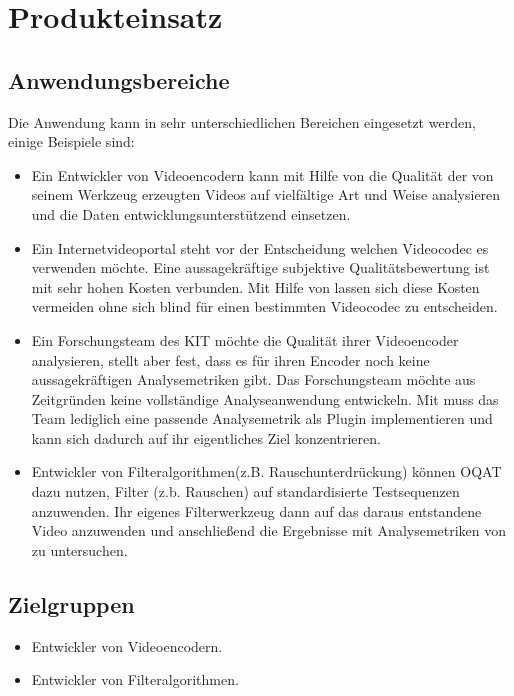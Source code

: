 \chapter{Produkteinsatz}
\section{Anwendungsbereiche}
Die Anwendung kann in sehr unterschiedlichen Bereichen eingesetzt werden, einige Beispiele sind:
\begin{itemize}
\item Ein Entwickler von Videoencodern kann mit Hilfe von \projektTitel die Qualität der von seinem
		Werkzeug erzeugten Videos auf vielfältige Art und Weise analysieren und die Daten
		entwicklungsunterstützend einsetzen.
\item Ein Internetvideoportal steht vor der Entscheidung welchen Videocodec es verwenden möchte.
		Eine aussagekräftige subjektive Qualitätsbewertung ist mit sehr hohen Kosten verbunden.
		Mit Hilfe von \projektTitel lassen sich diese Kosten vermeiden ohne sich blind für
		einen bestimmten Videocodec zu entscheiden.
\item Ein Forschungsteam des \gls{KIT} möchte die Qualität ihrer Videoencoder analysieren, stellt
		aber fest, dass es für ihren Encoder noch keine aussagekräftigen Analysemetriken gibt.
		Das Forschungsteam möchte aus Zeitgründen keine vollständige Analyseanwendung entwickeln.
		Mit \projektTitel muss das Team lediglich eine passende Analysemetrik als Plugin
		implementieren und kann sich dadurch auf ihr eigentliches Ziel konzentrieren.
\item Entwickler von Filteralgorithmen(z.B. Rauschunterdrückung) können \gls{OQAT} dazu nutzen, Filter (z.b. Rauschen) auf standardisierte Testsequenzen anzuwenden. Ihr eigenes Filterwerkzeug dann auf das daraus entstandene Video anzuwenden und anschließend die Ergebnisse mit Analysemetriken von \projektTitel zu untersuchen.
\end{itemize}
\section{Zielgruppen}
\begin{itemize}
\item Entwickler von Videoencodern.
\item Entwickler von Filteralgorithmen.
\end{itemize}